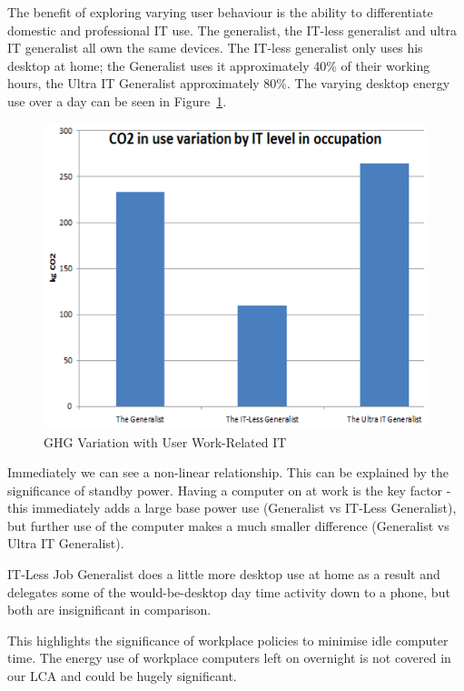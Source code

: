 \documentclass[conference]{IEEEtran}
\begin{document}
The benefit of exploring varying user behaviour is the ability to
differentiate domestic and professional IT use. The generalist, the
IT-less generalist and ultra IT generalist all own the same
devices. The IT-less generalist only uses his desktop at home; the
Generalist uses it approximately 40\% of their working hours, the
Ultra IT Generalist approximately 80\%. The varying desktop energy use
over a day can be seen in Figure~\ref{fig:ghgvariation_userworkrelatedit}.

\begin{figure}[!ht]
\centering
\includegraphics[width=\columnwidth]{images/ghgvariation_userworkrelatedit.png}
\caption{GHG Variation with User Work-Related IT}
\label{fig:ghgvariation_userworkrelatedit} 
\end{figure}

Immediately we can see a non-linear relationship. This can be
explained by the significance of standby power. Having a computer on
at work is the key factor - this immediately adds a large base power
use (Generalist vs IT-Less Generalist), but further use of the
computer makes a much smaller difference (Generalist vs Ultra IT
Generalist).

IT-Less Job Generalist does a little more desktop use at home as a
result and delegates some of the would-be-desktop day time activity
down to a phone, but both are insignificant in comparison.

This highlights the significance of workplace policies to minimise
idle computer time. The energy use of workplace computers left on
overnight is not covered in our LCA and could be hugely significant.
\end{document}
